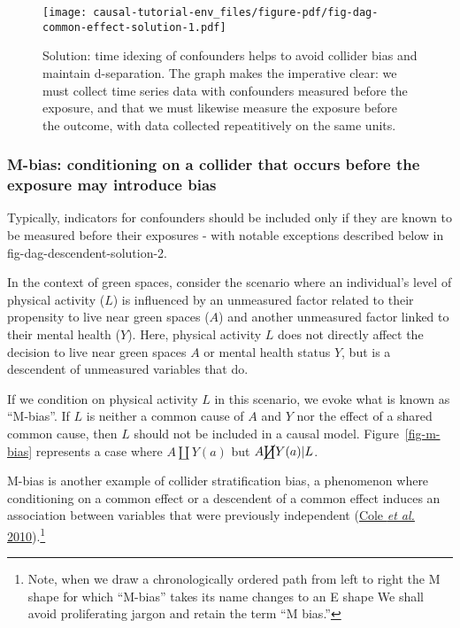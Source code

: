 \documentclass[
  singlecolumn]{article}
\begin{document}
\begin{figure}

{\centering \texttt{[image: causal-tutorial-env\_files/figure-pdf/fig-dag-common-effect-solution-1.pdf]}

}

\caption{\label{fig-dag-common-effect-solution}Solution: time idexing of
confounders helps to avoid collider bias and maintain d-separation. The
graph makes the imperative clear: we must collect time series data with
confounders measured before the exposure, and that we must likewise
measure the exposure before the outcome, with data collected
repeatitively on the same units.}

\end{figure}

\hypertarget{m-bias-conditioning-on-a-collider-that-occurs-before-the-exposure-may-introduce-bias}{%
\subsubsection{M-bias: conditioning on a collider that occurs before the
exposure may introduce
bias}\label{m-bias-conditioning-on-a-collider-that-occurs-before-the-exposure-may-introduce-bias}}

Typically, indicators for confounders should be included only if they
are known to be measured before their exposures - with notable
exceptions described below in fig-dag-descendent-solution-2.

In the context of green spaces, consider the scenario where an
individual's level of physical activity (\(L\)) is influenced by an
unmeasured factor related to their propensity to live near green spaces
(\(A\)) and another unmeasured factor linked to their mental health
(\(Y\)). Here, physical activity \(L\) does not directly affect the
decision to live near green spaces \(A\) or mental health status \(Y\),
but is a descendent of unmeasured variables that do.

If we condition on physical activity \(L\) in this scenario, we evoke
what is known as ``M-bias''. If \(L\) is neither a common cause of \(A\)
and \(Y\) nor the effect of a shared common cause, then \(L\) should not
be included in a causal model. Figure~\ref{fig-m-bias} represents a case
where \(A \coprod Y(a)\) but \(A \cancel{\coprod} Y(a)| L\).

M-bias is another example of collider stratification bias, a phenomenon
where conditioning on a common effect or a descendent of a common effect
induces an association between variables that were previously
independent (\protect\hyperlink{ref-cole2010}{Cole \emph{et al.}
2010}).\footnote{Note, when we draw a chronologically ordered path from
  left to right the M shape for which ``M-bias'' takes its name changes
  to an E shape We shall avoid proliferating jargon and retain the term
  ``M bias.''}
\end{document}
